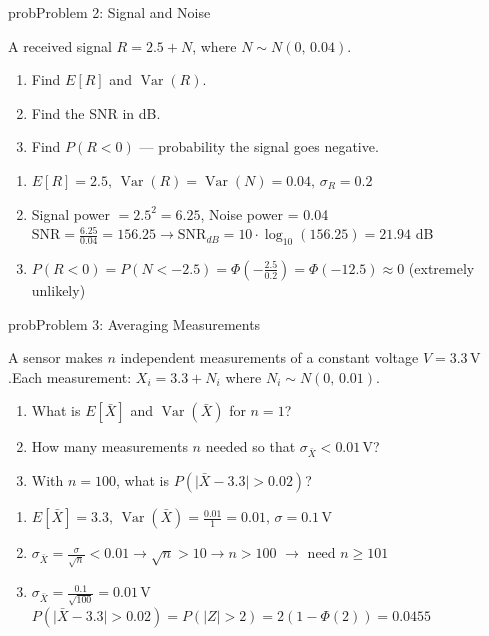\begin{PSbox}[unbreakable]{prob}{Problem 2: Signal and Noise}

A received signal $R = 2.5 + N$, where $N \sim N(0,\, 0.04)$.

\begin{enumerate}
\def\labelenumi{(\alph{enumi})}
\tightlist
\item
  Find $E[R]$ and $\operatorname{Var}(R)$.
\item
  Find the SNR in dB.
\item
  Find $P(R < 0)$ — probability the signal goes negative.
\end{enumerate}

\PSsolution{} 

\begin{enumerate}
\def\labelenumi{(\alph{enumi})}
\item
  $E[R] = 2.5,\, \operatorname{Var}(R) = \operatorname{Var}(N) = 0.04,\, \sigma_{R} = 0.2$
\item
  Signal power $= 2.5^{2} = 6.25$, Noise power = 0.04\PSbr{}$\mathrm{SNR} = \frac{6.25}{0.04} = 156.25 \to \mathrm{SNR}_{dB} = 10 \cdot \log_{10}(156.25) = 21.94$ dB
\item
  $P(R < 0) = P(N < -2.5) = \Phi \left(-\frac{2.5}{0.2}\right) = \Phi (-12.5) \approx 0$ (extremely unlikely)
\end{enumerate}

\end{PSbox}

\begin{PSbox}[unbreakable]{prob}{Problem 3: Averaging Measurements}

A sensor makes $n$ independent measurements of a constant voltage $V = 3.3\,\mathrm{V}$.\PSbr{}Each measurement: $X_{i} = 3.3 + N_{i}$ where $N_{i} \sim N(0,\, 0.01)$.

\begin{enumerate}
\def\labelenumi{(\alph{enumi})}
\tightlist
\item
  What is $E[\bar{X}]$ and $\operatorname{Var}(\bar{X})$ for $n = 1$?
\item
  How many measurements $n$ needed so that $\sigma_{\bar{X}} < 0.01\,\mathrm{V}$?
\item
  With $n = 100$, what is $P(\lvert \bar{X} - 3.3\rvert > 0.02)$?
\end{enumerate}

\PSsolution{} 

\begin{enumerate}
\def\labelenumi{(\alph{enumi})}
\item
  $\displaystyle E[\bar{X}] = 3.3,\, \operatorname{Var}(\bar{X}) = \frac{0.01}{1} = 0.01,\, \sigma = 0.1\,\mathrm{V}$
\item
  $\sigma_{\bar{X}} = \frac{\sigma}{\sqrt{n}} < 0.01 \to \sqrt{n} > 10 \to n > 100$ \ensuremath{\to} need $n \ge 101$
\item
  $\displaystyle \sigma_{\bar{X}} = \frac{0.1}{\sqrt{100}} = 0.01\,\mathrm{V}$\PSbr{}$P(\lvert \bar{X} - 3.3\rvert > 0.02) = P(\lvert Z\rvert > 2) = 2(1-\Phi (2)) = 0.0455$
\end{enumerate}

\end{PSbox}

